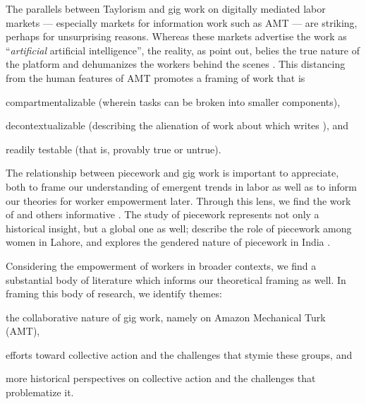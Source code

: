 \documentclass[11pt]{article}
\makeatletter
\newcounter{countitems}
\newcounter{nextitemizecount}
\newcommand{\nextitemizecount}{%
  \getrefnumber{countitems@\number\c@nextitemizecount}%
}
\makeatother
\begin{document}
The parallels between Taylorism and gig work on digitally mediated labor markets
--- especially markets for information work such as AMT ---
are striking, perhaps for unsurprising reasons.
Whereas these markets advertise the work as
``\textit{artificial} artificial intelligence'',
the reality, as
\citeauthor{turkopticon}
point out,
belies the true nature of the platform and dehumanizes the workers behind the scenes
\citep{turkopticon}.
This distancing from the human features of AMT promotes a framing of work that is
\begin{inlinelist}
  \item compartmentalizable (wherein tasks can be broken into smaller components),
  \item decontextualizable (describing the alienation of work about which
  \citeauthor{marx2012economic}
  writes
  \citep{marx2012economic}), and
  \item readily testable (that is, provably true or untrue).
\end{inlinelist}

The relationship between piecework and gig work is important to appreciate, both
to frame our understanding of emergent trends in labor
as well as
to inform our theories for worker empowerment later.
Through this lens, we find the work of
\citeauthor{riis2004other}
and others informative
\citep{riis2004other,gringeri1994getting,herzog1980hand}.
The study of piecework represents not only a historical insight,
but a global one as well;
\citeauthor{shaheed1983invisible}
describe the role of piecework among women in Lahore,
and
\citeauthor{hahn1996feminization}
explores the gendered nature of piecework in India
\citep{shaheed1983invisible,hahn1996feminization}.

Considering the empowerment of workers in broader contexts,
we find a substantial body of literature which informs our theoretical framing as well.
In framing this body of research,
we identify \nextitemizecount{} themes:
\begin{inlinelist}
  \item the collaborative nature of gig work, namely on Amazon Mechanical Turk (AMT),
  \item efforts toward collective action and the challenges that stymie these groups, and
  \item more historical perspectives on collective action and the challenges that problematize it.
\end{inlinelist}
\end{document}
